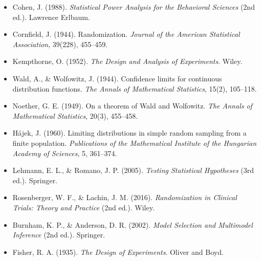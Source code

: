 \documentclass[
]{article}
\providecommand{\tightlist}{%
  \setlength{\itemsep}{0pt}\setlength{\parskip}{0pt}}
\begin{document}
\begin{itemize}
\tightlist
\item
  Cohen, J. (1988). \emph{Statistical Power Analysis for the Behavioral
  Sciences} (2nd ed.). Lawrence Erlbaum.
\item
  Cornfield, J. (1944). Randomization. \emph{Journal of the American
  Statistical Association}, 39(228), 455--459.
\item
  Kempthorne, O. (1952). \emph{The Design and Analysis of Experiments}.
  Wiley.
\item
  Wald, A., \& Wolfowitz, J. (1944). Confidence limits for continuous
  distribution functions. \emph{The Annals of Mathematical Statistics},
  15(2), 105--118.
\item
  Noether, G. E. (1949). On a theorem of Wald and Wolfowitz. \emph{The
  Annals of Mathematical Statistics}, 20(3), 455--458.
\item
  Hájek, J. (1960). Limiting distributions in simple random sampling
  from a finite population. \emph{Publications of the Mathematical
  Institute of the Hungarian Academy of Sciences}, 5, 361--374.
\item
  Lehmann, E. L., \& Romano, J. P. (2005). \emph{Testing Statistical
  Hypotheses} (3rd ed.). Springer.
\item
  Rosenberger, W. F., \& Lachin, J. M. (2016). \emph{Randomization in
  Clinical Trials: Theory and Practice} (2nd ed.). Wiley.
\item
  Burnham, K. P., \& Anderson, D. R. (2002). \emph{Model Selection and
  Multimodel Inference} (2nd ed.). Springer.
\item
  Fisher, R. A. (1935). \emph{The Design of Experiments}. Oliver and
  Boyd.
\end{itemize}
\end{document}
